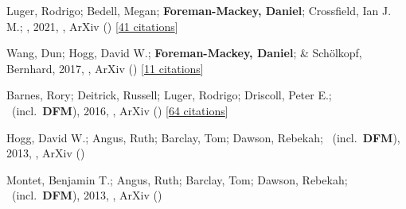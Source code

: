 \item[{\color{numcolor}\scriptsize5}] Luger, Rodrigo; Bedell, Megan; \textbf{Foreman-Mackey, Daniel}; Crossfield, Ian J. M.; \etal, 2021, , ArXiv () [\href{https://ui.adsabs.harvard.edu/abs/2021arXiv211006271L}{41 citations}]

\item[{\color{numcolor}\scriptsize4}] Wang, Dun; Hogg, David W.; \textbf{Foreman-Mackey, Daniel}; \& Sch{\"o}lkopf, Bernhard, 2017, , ArXiv () [\href{https://ui.adsabs.harvard.edu/abs/2017arXiv171002428W}{11 citations}]

\item[{\color{numcolor}\scriptsize3}] Barnes, Rory; Deitrick, Russell; Luger, Rodrigo; Driscoll, Peter E.; \etal\ (incl.\ \textbf{DFM}), 2016, , ArXiv () [\href{https://ui.adsabs.harvard.edu/abs/2016arXiv160806919B}{64 citations}]

\item[{\color{numcolor}\scriptsize2}] Hogg, David W.; Angus, Ruth; Barclay, Tom; Dawson, Rebekah; \etal\ (incl.\ \textbf{DFM}), 2013, , ArXiv ()

\item[{\color{numcolor}\scriptsize1}] Montet, Benjamin T.; Angus, Ruth; Barclay, Tom; Dawson, Rebekah; \etal\ (incl.\ \textbf{DFM}), 2013, , ArXiv ()
